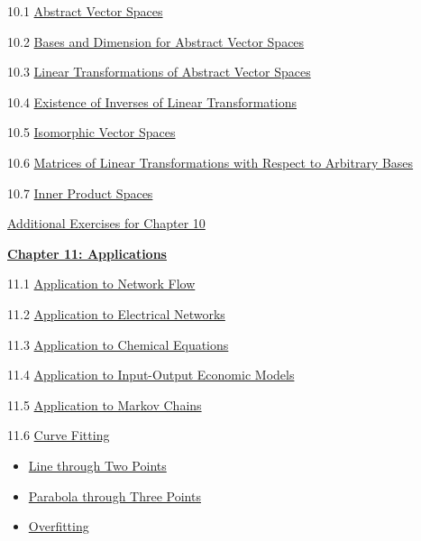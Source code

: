 \documentclass{ximera}
\begin{document}
10.1	\href{https://ximera.osu.edu/oerlinalg/LinearAlgebra/VSP-0050/main}{Abstract Vector Spaces}
	
10.2	\href{https://ximera.osu.edu/oerlinalg/LinearAlgebra/VSP-0060/main}{Bases and Dimension for Abstract Vector Spaces}
	
10.3	\href{https://ximera.osu.edu/oerlinalg/LinearAlgebra/LTR-0022/main}{Linear Transformations of Abstract Vector Spaces}
	
10.4	\href{https://ximera.osu.edu/oerlinalg/LinearAlgebra/LTR-0025/main}{Existence of Inverses of Linear Transformations}
	
10.5	\href{https://ximera.osu.edu/oerlinalg/LinearAlgebra/LTR-0035/main}{Isomorphic Vector Spaces}
	
10.6	\href{https://ximera.osu.edu/oerlinalg/LinearAlgebra/LTR-0060/main}{Matrices of Linear Transformations with Respect to Arbitrary Bases}
	
10.7	\href{https://ximera.osu.edu/oerlinalg/LinearAlgebra/LTR-0080/main}{Inner Product Spaces}
	
\href{https://ximera.osu.edu/oerlinalg/LinearAlgebra/SUPX-0100/main}{Additional Exercises for Chapter 10}
	
\href{https://ximera.osu.edu/oerlinalg/LinearAlgebra/XLAChapter_applications/main}{\textbf{Chapter 11: Applications}}
	
11.1	\href{https://ximera.osu.edu/oerlinalg/LinearAlgebra/APP-0010/main}{Application to Network Flow}
	
11.2	\href{https://ximera.osu.edu/oerlinalg/LinearAlgebra/APP-0020/main}{Application to Electrical Networks}
	
11.3	\href{https://ximera.osu.edu/oerlinalg/LinearAlgebra/APP-0030/main}{Application to Chemical Equations}
	
11.4	\href{https://ximera.osu.edu/oerlinalg/LinearAlgebra/APP-0050/main}{Application to Input-Output Economic Models}
	
11.5	\href{https://ximera.osu.edu/oerlinalg/LinearAlgebra/APP-0060/main}{Application to Markov Chains}

11.6 \href{https://ximera.osu.edu/oerlinalg/LinearAlgebra/APP-0070/main}{Curve Fitting}

\begin{itemize}
    \item \href{https://www.geogebra.org/classic/aupuxe5j}{Line through Two Points}
    \item \href{https://www.geogebra.org/classic/m6mbcykf}{Parabola through Three Points}
    \item \href{https://www.geogebra.org/classic/z2qhxkmm}{Overfitting}
\end{itemize}
	
\end{document}
